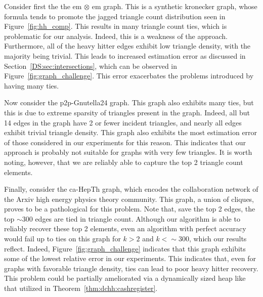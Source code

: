 \documentclass[10]{article}
\begin{document}
Consider first the the em $\otimes$ em graph. 
This is a synthetic kronecker graph, whose formula tends to promote the jagged triangle count distribution seen in Figure~\ref{fig:hh_comp}.
This results in many triangle count ties, which is problematic for our analysis. 
Indeed, this is a weakness of the approach.
Furthermore, all of the heavy hitter edges exhibit low triangle density, with the majority being trivial. 
This leads to increased estimation error as discussed in Section~\ref{DS:sec:intersections}, which can be observed in Figure~\ref{fig:graph_challenge}.
This error exacerbates the problems introduced by having many ties.

Now consider the p2p-Gnutella24 graph. 
This graph also exhibits many ties, but this is due to extreme sparsity of triangles present in the graph. 
Indeed, all but 14 edges in the graph have 2 or fewer incident triangles, and nearly all edges exhibit trivial triangle density.
This graph also exhibits the most estimation error of those considered in our experiments for this reason.
This indicates that our approach is probably not suitable for graphs with very few triangles.
It is worth noting, however, that we are reliably able to capture the top 2 triangle count elements. 

Finally, consider the ca-HepTh graph, which encodes the collaboration network of the Arxiv high energy physics theory community.
This graph, a union of cliques, proves to be a pathological for this problem. 
Note that, save the top 2 edges, the top $\sim 300$ edges are tied in triangle count.
Although our algorithm is able to reliably recover these top 2 elements, even an algorithm with perfect accuracy would fail up to ties on this graph for $k >2$ and $k < \sim 300$, which our results reflect.
Indeed, Figure~\ref{fig:graph_challenge} indicates that this graph exhibits some of the lowest relative error in our experiments.
This indicates that, even for graphs with favorable triangle density, ties can lead to poor heavy hitter recovery. 
This problem could be partially ameliorated via a dynamically sized heap like that utilized in Theorem~\ref{thm:dchh:cashregister}.
\end{document}
